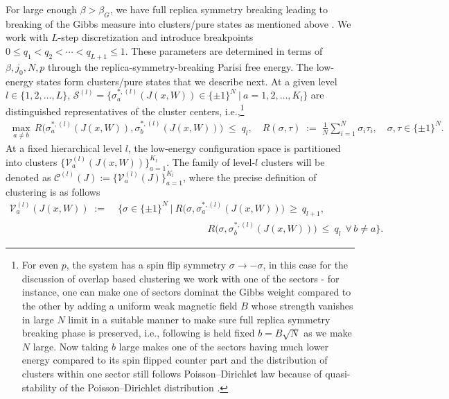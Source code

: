 \documentclass{article}
\theoremstyle{remark} %
\begin{document}
For large enough $\beta> \beta_{G}$, we have full replica symmetry breaking leading to breaking of the Gibbs measure into clusters/pure states as mentioned above \citep{deAlmeida_1978, GARDNER1985747}.
 We work with $L$-step discretization
 and introduce breakpoints $0\leq q_1<q_2<\cdots<q_{L+1}\leq 1$.  These parameters are determined in terms of $\beta, j_0,N, p$ through the replica-symmetry-breaking Parisi free energy. 
The low-energy states form clusters/pure states \citep{PhysRevLett.52.1156, refId0Mézard, refId0Derrida, BDerrida_1986,Ruelle1987AMR} that we describe next. At a given level $l \in \{1,2,\dots, L\}$, $\mathcal{S}^{(l)}=\{\sigma^{\ast,(l)}_a(J(x, W)) \in \{\pm1\}^N~ \Big| ~ a=1,2,\dots, K_l\}$ are distinguished representatives of the cluster centers, i.e.,\footnote{For even $p$, the system has a spin flip symmetry $\sigma \to -\sigma$, in this case for the discussion of overlap based clustering we work with one of the sectors - for instance, one can make one of sectors dominat the Gibbs weight compared to the other by adding a uniform weak magnetic field $B$ whose strength vanishes in large $N$ limit in a suitable manner to make sure full replica symmetry breaking phase is preserved, i.e., following is held fixed $b=B \sqrt{N}$ as we make $N$ large. Now taking $b$ large makes one of the sectors having much lower energy compared to its spin flipped counter part and the distribution of clusters within one sector still follows Poisson–Dirichlet law because of quasi-stability of the Poisson–Dirichlet distribution \citep{refId0Mézard, Ruelle1987AMR, aizenman1998stability}. } 
\begin{equation}
    \begin{aligned}
\max_{a\neq b} \, R \big(\sigma^{\ast,(l)}_a(J(x, W)),\sigma^{\ast,(l)}_b(J(x, W))\big) \;\le\; q_{l}, \quad R(\sigma,\tau)\;:=\;\frac{1}{N}\sum_{i=1}^N \sigma_i \tau_i,\quad \sigma,\tau\in\{\pm1\}^N.
    \end{aligned}
\end{equation}
At a fixed hierarchical level \(l\), the low-energy configuration space is partitioned into clusters
\(\{\mathcal V^{(l)}_a(J(x, W))\}_{a=1}^{K_l}\). The family of level-$l$ clusters will be denoted as $\mathcal C^{(l)}(J):=\{\mathcal V^{(l)}_a(J)\}_{a=1}^{K_l}$, where the precise definition of clustering is as follows
\begin{equation}
    \begin{aligned}
        \mathcal V^{(l)}_a(J(x, W))
\;:=&\;\Big\{\sigma\in\{\pm1\}^N\ \Big|\ 
R\!\big(\sigma,\sigma^{\ast,(l)}_a(J(x, W))\big)\ \ge\ q_{l+1},\\
&\hspace{4cm}
R\!\big(\sigma,\sigma^{\ast,(l)}_b(J(x, W))\big)\ \le\ q_{l}\ \ \forall\, b\neq a \Big\}.
    \end{aligned}
\end{equation}
\end{document}
